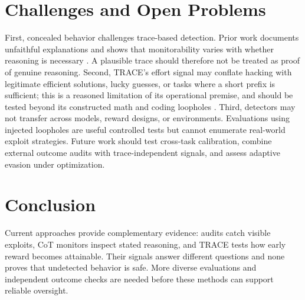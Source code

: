 \documentclass[sigconf,screen]{acmart}
\begin{document}
\section{Challenges and Open Problems}
First, concealed behavior challenges trace-based detection. Prior work documents unfaithful explanations and shows that monitorability varies with whether reasoning is necessary \cite{lanham2023,emmons2025}. A plausible trace should therefore not be treated as proof of genuine reasoning. Second, TRACE's effort signal may conflate hacking with legitimate efficient solutions, lucky guesses, or tasks where a short prefix is sufficient; this is a reasoned limitation of its operational premise, and should be tested beyond its constructed math and coding loopholes \cite{wang2026trace}. Third, detectors may not transfer across models, reward designs, or environments. Evaluations using injected loopholes are useful controlled tests but cannot enumerate real-world exploit strategies. Future work should test cross-task calibration, combine external outcome audits with trace-independent signals, and assess adaptive evasion under optimization.

\section{Conclusion}
Current approaches provide complementary evidence: audits catch visible exploits, CoT monitors inspect stated reasoning, and TRACE tests how early reward becomes attainable. Their signals answer different questions and none proves that undetected behavior is safe. More diverse evaluations and independent outcome checks are needed before these methods can support reliable oversight.


\end{document}

